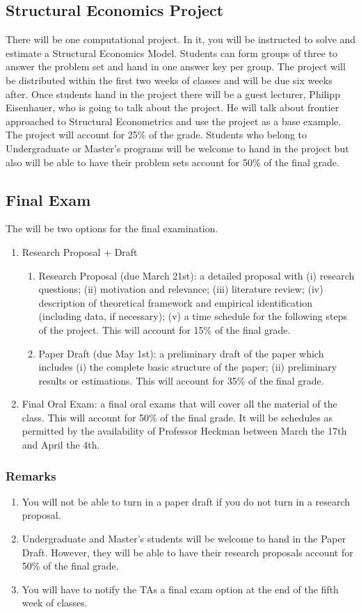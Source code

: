 \documentclass[12pt]{article}
\begin{document}
\subsection{Structural Economics Project}
\noindent There will be one computational project. In it, you will be instructed to solve and estimate a Structural Economics Model. Students can form groups of three to answer the problem set and hand in one answer key per group. The project will be distributed within the first two weeks of classes and will be due six weeks after. Once students hand in the project there will be a guest lecturer, Philipp Eisenhauer, who is going to talk about the project. He will talk about frontier approached to Structural Econometrics and use the project as a base example. The project will account for 25\% of the grade. Students who belong to Undergraduate or Master's programs will be welcome to hand in the project but also will be able to have their problem sets account for 50\% of the final grade.
\subsection{Final Exam}
The will be two options for the final examination.
\begin{enumerate}
\item Research Proposal + Draft
\begin{enumerate}
\item Research Proposal (due March 21st): a detailed proposal with (i) research questions; (ii) motivation and relevance; (iii) literature review; (iv) description of theoretical framework and empirical identification (including data, if necessary); (v) a time schedule for the following steps of the project. This will account for 15\% of the final grade. 
\item Paper Draft (due May 1st): a preliminary draft of the paper which includes (i) the complete basic structure of the paper; (ii) preliminary results or estimations. This will account for 35\% of the final grade.
\end{enumerate}
\item Final Oral Exam: a final oral exams that will cover all the material of the class. This will account for 50\% of the final grade. It will be schedules as permitted by the availability of Professor Heckman between March the 17th and April the 4th. 
\end{enumerate}
\subsubsection{Remarks}
\begin{enumerate}
\item You will not be able to turn in a paper draft if you do not turn in a research proposal.
\item Undergraduate and Master’s students will be welcome to hand in the Paper Draft. However, they will be able to have their research proposals account for 50\% of the final grade. 
\item You will have to notify the TAs a final exam option at the end of the fifth week of classes.
\end{enumerate}
\end{document}
